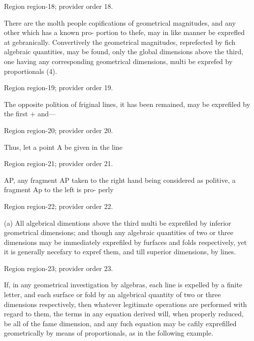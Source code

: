 \documentclass[11pt]{article}
\begin{document}
{\scriptsize\color{gray} Region region-18; provider order 18.\par}
\medskip

There are the molth people copifications of geometrical
magnitudes, and any other which has a known pro-
portion to thefe, may in like manner be exprefled at
gebranically. Convertively the geometrical magnitudes,
reprefected by fich algebraic quantities, may be
found, only the global dimensions above the third,
one having any corresponding geometrical dimensions,
multi be exprefed by proportionals (4).
\par

{\scriptsize\color{gray} Region region-19; provider order 19.\par}
\medskip

The opposite polition of friginal lines, it has been
remained, may be exprefiled by the first + and—
\par

{\scriptsize\color{gray} Region region-20; provider order 20.\par}
\medskip

Thus, let a point A be given in the line
\par

{\scriptsize\color{gray} Region region-21; provider order 21.\par}
\medskip

AP, any fragment AP taken to the right hand being
considered as politive, a fragment Ap to the left is pro-
perly
\par

{\scriptsize\color{gray} Region region-22; provider order 22.\par}
\medskip

(a) All algebrical dimentions above the third multi be exprefiled by inferior geometrical dimensions; and
though any algebraic quantities of two or three dimensions may be immediately exprefiled by furfaces and
folds respectively, yet it is generally necefary to expref them, and till superior dimensions, by lines.
\par

{\scriptsize\color{gray} Region region-23; provider order 23.\par}
\medskip

If, in any geometrical investigation by algebras, each line is expelled by a finite letter, and each surface or
fold by an algebrical quantity of two or three dimensions respectively, then whatever legitimate operations are
performed with regard to them, the terms in any equation derived will, when properly reduced, be all of the
fame dimension, and any fuch equation may be cafily exprefilled geometrically by means of proportionals, as in
the following example.
\par
\end{document}
